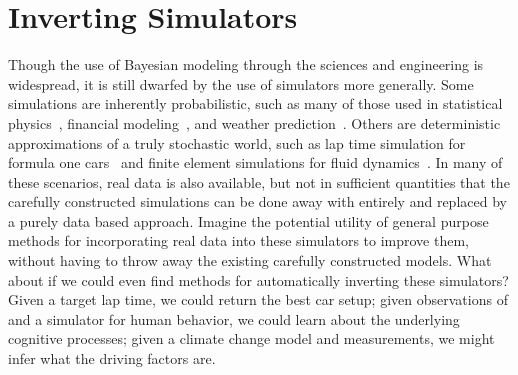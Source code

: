 
\section{Inverting Simulators}
\label{sec:probprog:inv}

Though the use of Bayesian modeling through the sciences and engineering is widespread,
it is still dwarfed by the use of simulators more generally.  Some simulations are inherently
probabilistic, such as many of those used in statistical physics~\citep{landau2014guide},
 financial modeling~\citep{jackel2002monte}, and weather prediction~\cite{evensen1994sequential}.  
 Others are deterministic approximations
of a truly stochastic world, such as lap time simulation for formula one cars~\citep{perantoni2014optimal}
and finite element simulations for fluid dynamics~\citep{versteeg2007introduction}.
In many of these scenarios, real data is also available, but not in sufficient quantities that the carefully
constructed simulations can be done away with entirely and replaced by a purely data based
approach.  
Imagine the potential utility of general purpose methods for incorporating real data
into these simulators to improve them, without having to throw away the existing carefully constructed models.  
What about if we could even find methods for automatically
inverting these simulators?  Given a target lap time, we could return the best car setup; given observations
of and a simulator for human behavior, we could learn about the underlying cognitive processes; given
a climate change model and measurements, we might infer what the driving factors are.  


